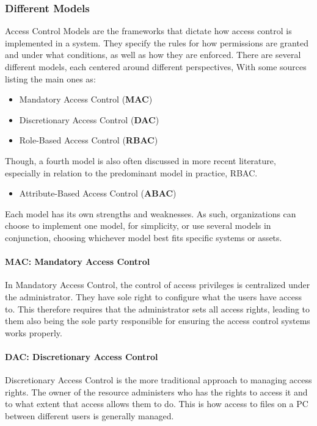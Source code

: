 \subsubsection{Different Models}
Access Control Models are the frameworks that dictate how access control is implemented in a system. They specify the rules for how permissions are granted and under what conditions, as well as how they are enforced. There are several different models, each centered around different perspectives, With some sources listing the main ones as:\citep{RountreeDerrick2010SfMW}
\begin{itemize}
	\item Mandatory Access Control (\textbf{MAC})
	\item Discretionary Access Control (\textbf{DAC})
	\item Role-Based Access Control (\textbf{RBAC})
\end{itemize}
Though, a fourth model is also often discussed in more recent literature, especially in relation to the predominant model in practice, RBAC\citep{addABACtoRBAC2010, ABACandRBAC2013}.
\begin{itemize}
	\item Attribute-Based Access Control (\textbf{ABAC})
\end{itemize}
Each model has its own strengths and weaknesses. As such, organizations can choose to implement one model, for simplicity, or use several models in conjunction, choosing whichever model best fits specific systems or assets.

\paragraph{MAC: Mandatory Access Control}
In Mandatory Access Control, the control of access privileges is centralized under the administrator. They have sole right to configure what the users have access to. This therefore requires that the administrator sets all access rights, leading to them also being the sole party responsible for ensuring the access control systems works properly.

\paragraph{DAC: Discretionary Access Control}
Discretionary Access Control is the more traditional approach to managing access rights. The owner of the resource administers who has the rights to access it and to what extent that access allows them to do. This is how access to files on a PC between different users is generally managed.

